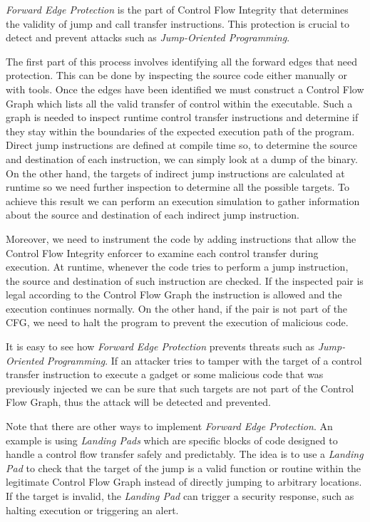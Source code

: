 \textit{Forward Edge Protection} is the part of Control Flow Integrity that
determines the validity of jump and call transfer instructions. This protection is
crucial to detect and prevent attacks such as \textit{Jump-Oriented Programming}.

The first part of this process involves identifying all the forward edges that
need protection. This can be done by inspecting the source code either manually or
with tools. Once the edges have been identified we must construct a Control Flow
Graph which lists all the valid transfer of control within the executable. Such a
graph is needed to inspect runtime control transfer instructions and determine if
they stay within the boundaries of the expected execution path of the program.
Direct jump instructions are defined at compile time so, to determine the source
and destination of each instruction, we can simply look at a dump of the binary.
On the other hand, the targets of indirect jump instructions are calculated at
runtime so we need further inspection to determine all the possible targets. To achieve
this result we can perform an execution simulation to gather information about the
source and destination of each indirect jump instruction.

Moreover, we need to instrument the code by adding instructions that allow the
Control Flow Integrity enforcer to examine each control transfer during
execution. At runtime, whenever the code tries to perform a jump instruction, the
source and destination of such instruction are checked. If the inspected pair is
legal according to the Control Flow Graph the instruction is allowed and the
execution continues normally. On the other hand, if the pair is not part of the
CFG, we need to halt the program to prevent the execution of malicious code.

It is easy to see how \textit{Forward Edge Protection} prevents threats such as
\textit{Jump-Oriented Programming}. If an attacker tries to tamper with the
target of a control transfer instruction to execute a gadget or some malicious
code that was previously injected we can be sure that such targets are not part
of the Control Flow Graph, thus the attack will be detected and prevented.

Note that there are other ways to implement \textit{Forward Edge Protection}. An
example is using \textit{Landing Pads} which are specific blocks of code
designed to handle a control flow transfer safely and predictably. The idea is to
use a \textit{Landing Pad} to check that the target of the jump is a valid
function or routine within the legitimate Control Flow Graph instead of directly
jumping to arbitrary locations. If the target is invalid, the \textit{Landing
Pad} can trigger a security response, such as halting execution or triggering an
alert.

